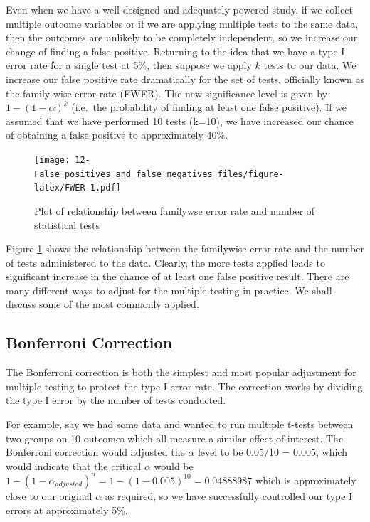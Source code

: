\documentclass[]{book}
\begin{document}
Even when we have a well-designed and adequately powered study, if we collect multiple outcome variables or if we are applying multiple tests to the same data, then the outcomes are unlikely to be completely independent, so we increase our change of finding a false positive. Returning to the idea that we have a type I error rate for a single test at 5\%, then suppose we apply \(k\) tests to our data. We increase our false positive rate dramatically for the set of tests, officially known as the family-wise error rate (FWER). The new significance level is given by \(1-(1-\alpha)^{k}\) (i.e.~the probability of finding at least one false positive). If we assumed that we have performed 10 tests (k=10), we have increased our chance of obtaining a false positive to approximately 40\%.

\begin{figure}
\centering
\texttt{[image: 12-False\_positives\_and\_false\_negatives\_files/figure-latex/FWER-1.pdf]}
\caption{\label{fig:FWER}Plot of relationship between familywse error rate and number of statistical tests}
\end{figure}

Figure \ref{fig:FWER} shows the relationship between the familywise error rate and the number of tests administered to the data. Clearly, the more tests applied leads to significant increase in the chance of at least one false positive result. There are many different ways to adjust for the multiple testing in practice. We shall discuss some of the most commonly applied.

\hypertarget{bonferroni-correction}{%
\subsection{Bonferroni Correction}\label{bonferroni-correction}}

The Bonferroni correction is both the simplest and most popular adjustment for multiple testing to protect the type I error rate. The correction works by dividing the type I error by the number of tests conducted.

For example, say we had some data and wanted to run multiple t-tests between two groups on 10 outcomes which all measure a similar effect of interest. The Bonferroni correction would adjusted the \(\alpha\) level to be 0.05/10 = 0.005, which would indicate that the critical \(\alpha\) would be \(1-(1-\alpha_{adjusted})^{n} = 1-(1-0.005)^{10} = 0.04888987\) which is approximately close to our original \(\alpha\) as required, so we have successfully controlled our type I errors at approximately 5\%.
\end{document}
